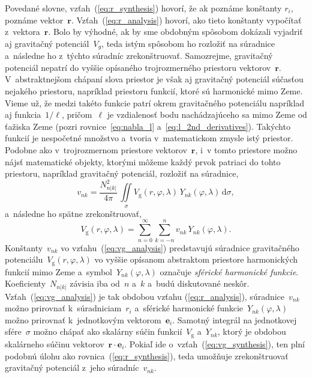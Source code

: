\documentclass[a4paper,12pt]{book}
\newcommand{\diff}{\mathrm d}
\newcommand{\gidx}{\mathrm g}
\let\vec\mathbf
\begin{document}
Povedané slovne, vzťah~(\ref{eq:r_synthesis}) hovorí, že ak poznáme konštanty 
$r_i$, poznáme vektor~$\vec r$.  Vzťah~(\ref{eq:r_analysis}) hovorí, ako tieto 
konštanty vypočítať z~vektora~$\vec r$.  Bolo by výhodné, ak by sme obdobným 
spôsobom dokázali vyjadriť aj gravitačný potenciál~$V_g$, teda istým spôsobom 
ho rozložiť na súradnice a~následne ho z~týchto súradníc zrekonštruovať.  
Samozrejme, gravitačný potenciál nepatrí do vyššie opísaného trojrozmerného 
priestoru vektorov~$\vec r$.  V~abstraktnejšom chápaní slova priestor je však 
aj gravitačný potenciál súčasťou nejakého priestoru, napríklad priestoru 
funkcií, ktoré sú harmonické mimo Zeme.  Vieme už, že medzi takéto funkcie 
patrí okrem gravitačného potenciálu napríklad aj funkcia~$1 \slash \ell$, 
pričom~$\ell$ je vzdialenosť bodu nachádzajúceho sa mimo Zeme od ťažiska Zeme 
(pozri rovnice~\ref{eq:nabla_l} a~\ref{eq:l_2nd_derivatives}).  Takýchto 
funkcií je nespočetné množstvo a~tvoria v~matematickom zmysle istý priestor.  
Podobne ako v~trojrozmernom priestore vektorov~$\vec r$, i~v tomto priestore 
možno nájsť matematické objekty, ktorými môžeme každý prvok patriaci do tohto 
priestoru, napríklad gravitačný potenciál, rozložiť na súradnice,
%
\begin{equation}
\label{eq:vg_analysis}
v_{nk} = \frac{N^2_{n|k|}}{4\pi} \, \iint\limits_{\sigma} V_\gidx(r, \varphi, 
\lambda) \, Y_{nk}(\varphi, \lambda) \, \diff \sigma{,}
\end{equation}
%
a~následne ho spätne zrekonštruovať,
%
\begin{equation}
\label{eq:vg_synthesis}
V_\gidx(r, \varphi, \lambda) = \sum_{n = 0}^{\infty} \sum_{k = -n}^{n} v_{nk}
\, Y_{nk}(\varphi, \lambda){.}
\end{equation}
%
Konštanty~$v_{nk}$ vo vzťahu~(\ref{eq:vg_analysis}) predstavujú súradnice
gravitačného potenciálu~$V_\gidx(r, \varphi, \lambda)$ vo vyššie opísanom
abstraktom priestore harmonických funkcií mimo Zeme a~symbol~$Y_{nk}(\varphi, 
\lambda)$
označuje \emph{sférické harmonické funkcie}.  Koeficienty~$N_{n|k|}$ závisia
iba od~$n$ a~$k$ a~budú diskutované neskôr.  Vzťah~(\ref{eq:vg_analysis}) je
tak obdobou vzťahu (\ref{eq:r_analysis}), súradnice~$v_{nk}$ možno prirovnať
k~súradniciam~$r_i$ a~sférické harmonické funkcie~$Y_{nk}(\varphi, \lambda)$
možno prirovnať k~jednotkovým vektorom~$\vec e_i$.  Samotný integrál na
jednotkovej sfére~$\sigma$ možno chápať ako skalárny súčin funkcií~$V_\gidx$
a~$Y_{nk}$, ktorý je obdobou skalárneho súčinu vektorov~$\vec r \cdot \vec
e_i$.  Pokiaľ ide o~vzťah~(\ref{eq:vg_synthesis}), ten plní podobnú úlohu ako
rovnica~(\ref{eq:r_synthesis}), teda umožňuje zrekonštruovať gravitačný
potenciál z~jeho súradníc~$v_{nk}$.
\end{document}
